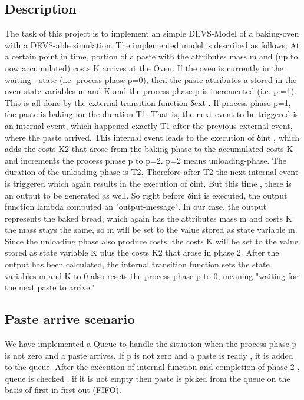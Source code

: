 \documentclass[titlepage]{article}%
\begin{document}
\subsection{Description}

The task of this project is to implement an simple DEVS-Model of a baking-oven with a DEVS-able simulation. The implemented model is described as follows;
At a certain point in time, portion of a paste with the attributes mass m and (up to now accumulated) costs K arrives at the Oven. If the oven is currently in the waiting - state (i.e. process-phase p=0), then the paste attributes a stored in the oven state variables m and K and the process-phase p is incremented (i.e. p:=1). This is all done by the external transition function δext . If process phase p=1, the paste is baking for the duration T1. That is, the next event to be triggered is an internal event, which happened exactly T1 after the previous external event, where the paste arrived. This internal event leads to the execution of  δint , which adds the costs K2 that arose from the baking phase to the accumulated costs K and increments the process phase p to p=2. p=2 means unloading-phase. The duration of the unloading phase is T2. Therefore after T2 the next internal event is triggered which again results in the execution of δint. But this time , there is an output to be generated as well. So right before δint is executed, the output function lambda computed an "output-message". In our case, the output represents the baked bread, which again has the attributes mass m and costs K. the mass stays the same, so m will be set to the value stored as state variable m. Since the unloading phase also produce costs, the costs K will be set to the value stored as state variable K plus the costs K2 that arose in phase 2. After the output has been calculated, the internal transition function sets the state variables m and K to 0 also resets the process phase p to 0, meaning "waiting for the next paste to arrive." 
\subsection{Paste arrive scenario}

We have implemented a Queue to handle the situation when the process phase p is not zero and a paste arrives. If p is not zero and a paste is ready , it is added to the queue. After the execution of internal function and completion of phase 2 , queue is checked , if it is not empty then paste is picked from the queue on the basis of first in first out (FIFO). 
\end{document}
